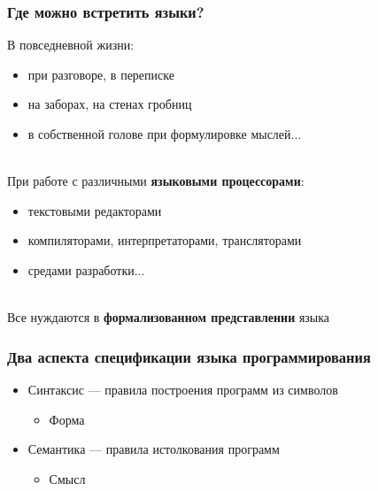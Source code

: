 \documentclass{beamer}
\begin{document}
\begin{frame}[fragile]
  \transwipe[direction=90]
  \frametitle{Где можно встретить языки?}
  В повседневной жизни: 
  \begin{itemize} 
    \item при разговоре, в переписке
    \item на заборах, на стенах гробниц
    \item в собственной голове при формулировке мыслей... 
  \end{itemize} 
\pause ~\\  
  При работе с различными \textbf{языковыми процессорами}:
  \begin{itemize}
    \item текстовыми редакторами
    \item компиляторами, интерпретаторами, трансляторами
    \item средами разработки...
  \end{itemize}
\pause ~\\
  Все нуждаются в \textbf{формализованном представлении} языка
\end{frame}

\begin{frame}[fragile]
  \transwipe[direction=90]
  \frametitle{Два аспекта спецификации языка программирования}
  \begin{itemize}
    \item Синтаксис --- правила построения программ из символов
    \begin{itemize}
      \item Форма
    \end{itemize}
    \item Семантика --- правила истолкования программ
    \begin{itemize}
      \item Смысл
    \end{itemize}
  \end{itemize}
\end{frame}
\end{document}
